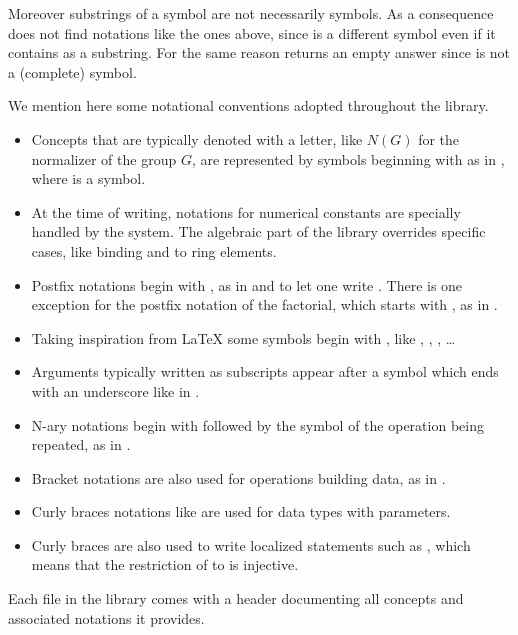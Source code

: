 Moreover substrings of a symbol are not necessarily symbols.  As a consequence
 does not find notations like the ones above, since \C{<=} is a
different symbol even if it contains \C{=} as a substring.  For the same reason
 returns an empty answer since  is not a (complete)
symbol.

We mention here some notational conventions
adopted throughout the \mcbMC{} library.


\begin{itemize}
\item Concepts that are typically denoted with a letter, like $N(G)$ for the
	normalizer of the group $G$, are represented by symbols beginning
	with  as in , where  is a symbol.
\item At the time of writing, notations for numerical constants are specially
	handled by the system.  The algebraic part of the library overrides
	specific cases, like binding  and  to ring elements.
\item Postfix notations begin with , as in  and 
	to let one write . There is one exception for
        the postfix notation of the factorial, which starts with
        , as in .
\item Taking inspiration from \LaTeX{} some symbols begin with \C{\\},
	like \C{\\in}, \C{\\matrix}, \C{\\sum}, \ldots
\item Arguments typically written as subscripts appear after a symbol
	which ends with an underscore like  in .
\item N-ary notations begin with \C{[} followed by the symbol of the
	operation being repeated, as in .
\item Bracket notations are also used  for operations building data, as in
	\C{[seq .. | .. ]}.
\item Curly braces notations like  are used for data types
	with parameters.
\item Curly braces are also used to write localized statements
	such as ,
	which means that the restriction of  to  is injective.
\end{itemize}

Each file in the \mcbMC{} library comes with a header documenting
all concepts and associated notations it provides.


